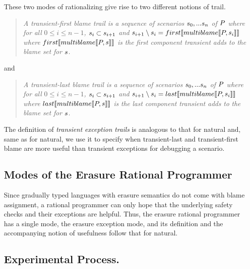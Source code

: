 These two modes of rationalizing give rise to two different notions of trail.
\begin{quote}
\it A \emph{transient-first blame trail} is a sequence of scenarios
$s_0,...s_n$ of $P$ where for all $0 \leq i \leq n - 1$,
$s_i \subset s_{i+1}$ and $s_{i+1} \setminus s_i =
first\llbracket multiblame\llbracket P, s_i\rrbracket\rrbracket$ where $first\llbracket multiblame\llbracket P, s\rrbracket\rrbracket$ is the
first component transient adds to the blame set for $s$.
\end{quote}

and 

\begin{quote}
\it A \emph{transient-last blame trail} is a sequence of scenarios
$s_0,...s_n$ of $P$ where for all $0 \leq i \leq n - 1$,
$s_i \subset s_{i+1}$ and $s_{i+1} \setminus s_i =
  last\llbracket multiblame\llbracket P, s_i\rrbracket\rrbracket$ where $last\llbracket multiblame\llbracket P, s\rrbracket\rrbracket$ is the
last component transient adds to the blame set for $s$.
\end{quote}

The definition of \emph{transient exception trails} 
is analogous to that for natural and, same as for natural, we use it to  
specify when  
transient-last and transient-first blame are more useful than 
transient exceptions for debugging a scenario.  


\subsection{Modes of the Erasure Rational Programmer} \label{sub:erasure}

 Since gradually typed languages with erasure semantics do not come with
 blame assignment, a rational programmer can only hope that the underlying
 safety checks and their exceptions are helpful.  Thus, the erasure 
 rational programmer has a single mode, the erasure exception mode, and
 its definition and the accompanying notion of usefulness follow that for
 natural.

\subsection{Experimental Process.}
\label{subsec:experiment}


